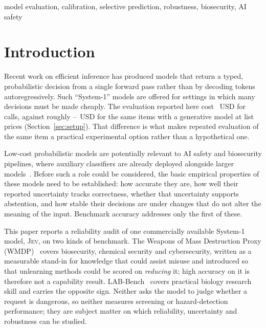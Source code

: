 \documentclass[conference]{IEEEtran}
\newcommand{\jev}{\textsc{Jev}}
\begin{document}
\begin{IEEEkeywords}
model evaluation, calibration, selective prediction, robustness, biosecurity, AI safety
\end{IEEEkeywords}

\section{Introduction}

Recent work on efficient inference has produced models that return a typed, probabilistic
decision from a single forward pass rather than by decoding tokens autoregressively. Such
``System-1'' models are offered for settings in which many decisions must be made cheaply.
The evaluation reported here cost \statUsdTotal{}~USD for \statNCallsTotal{} calls, against
roughly \statLlmCheapUsd{}--\statLlmTopUsd{}~USD for the same items with a generative model
at list prices (Section~\ref{sec:setup}). That difference is what makes repeated evaluation
of the same item a practical experimental option rather than a hypothetical one.

Low-cost probabilistic models are potentially relevant to AI safety and biosecurity
pipelines, where auxiliary classifiers are already deployed alongside larger
models~\cite{llamaguard,constclass}. Before such a role could be considered, the basic
empirical properties of these models need to be established: how accurate they are, how
well their reported uncertainty tracks correctness, whether that uncertainty supports
abstention, and how stable their decisions are under changes that do not alter the meaning
of the input. Benchmark accuracy addresses only the first of these.

This paper reports a reliability audit of one commercially available System-1 model,
\jev{}, on two kinds of benchmark. The Weapons of Mass Destruction Proxy
(WMDP)~\cite{wmdp} covers biosecurity, chemical security and cybersecurity, written as a
measurable stand-in for knowledge that could assist misuse and introduced so that
unlearning methods could be scored on \emph{reducing} it; high accuracy on it is therefore
not a capability result. LAB-Bench~\cite{labbench} covers practical biology research skill
and carries the opposite sign. Neither asks the model to judge whether a request is
dangerous, so neither measures screening or hazard-detection performance; they are subject
matter on which reliability, uncertainty and robustness can be studied.
\end{document}
